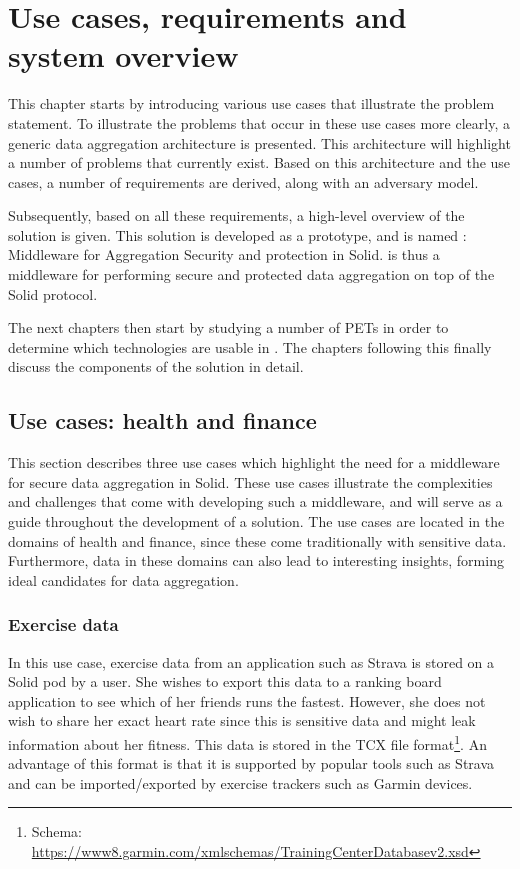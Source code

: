 \chapter{Use cases, requirements and system overview}
\label{cha:solution-overview}
This chapter starts by introducing various use cases that illustrate the problem statement. To illustrate the problems that occur in these use cases more clearly, a generic data aggregation architecture is presented. This architecture will highlight a number of problems that currently exist. Based on this architecture and the use cases, a number of requirements are derived, along with an adversary model.

Subsequently, based on all these requirements, a high-level overview of the solution is given. This solution is developed as a prototype, and is named \middleware{}: Middleware for Aggregation Security and protection in Solid. \middleware{} is thus a middleware for performing secure and protected data aggregation on top of the Solid protocol. 

The next chapters then start by studying a number of \gls{PETs} in order to determine which technologies are usable in \middleware{}. The chapters following this finally discuss the components of the solution in detail.

\section{Use cases: health and finance}
\label{sec:usecases}
This section describes three use cases which highlight the need for a middleware for secure data aggregation in Solid. These use cases illustrate the complexities and challenges that come with developing such a middleware, and will serve as a guide throughout the development of a solution. The use cases are located in the domains of health and finance, since these come traditionally with sensitive data. Furthermore, data in these domains can also lead to interesting insights, forming ideal candidates for data aggregation.

\subsection{Exercise data}
\label{usecase:ex-data}
In this use case, exercise data from an application such as Strava is stored on a Solid pod by a user. She wishes to export this data to a ranking board application to see which of her friends runs the fastest. However, she does not wish to share her exact heart rate since this is sensitive data and might leak information about her fitness. This data is stored in the TCX file format\footnote{Schema: \url{https://www8.garmin.com/xmlschemas/TrainingCenterDatabasev2.xsd}}. An advantage of this format is that it is supported by popular tools such as Strava and can be imported/exported by exercise trackers such as Garmin devices.

